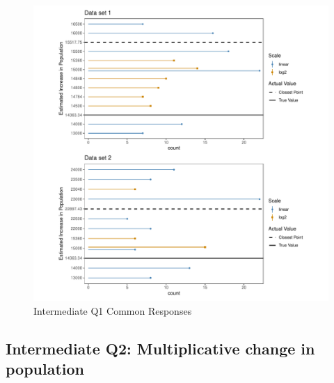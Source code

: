 \documentclass[print]{nuthesis}
\begin{document}
\begin{figure}[tbp]

{\centering \includegraphics[width=1\linewidth,]{thesis_files/figure-latex/qi1-common-responses-1} 

}

\caption{Intermediate Q1 Common Responses}\label{fig:qi1-common-responses}
\end{figure}

\hypertarget{intermediate-q2-multiplicative-change-in-population}{%
\subsection{Intermediate Q2: Multiplicative change in population}\label{intermediate-q2-multiplicative-change-in-population}}
\end{document}
